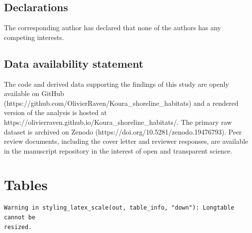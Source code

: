 \documentclass[
  12pt,
  a4paper,
]{scrbook}
\newcounter{none} %
\begin{document}
\section{Declarations}\label{declarations-1}

The corresponding author has declared that none of the authors has any
competing interests.

\section{Data availability
statement}\label{data-availability-statement-1}

The code and derived data supporting the findings of this study are
openly available on GitHub
(https://github.com/OlivierRaven/Koura\_shoreline\_habitats) and a
rendered version of the analysis is hosted at
https://olivierraven.github.io/Koura\_shoreline\_habitats/. The primary
raw dataset is archived on Zenodo
(https://doi.org/10.5281/zenodo.19476793). Peer review documents,
including the cover letter and reviewer responses, are available in the
manuscript repository in the interest of open and transparent science.


\chapter{Tables}\label{tables-1}

\begin{verbatim}
Warning in styling_latex_scale(out, table_info, "down"): Longtable cannot be
resized.
\end{verbatim}
\end{document}
